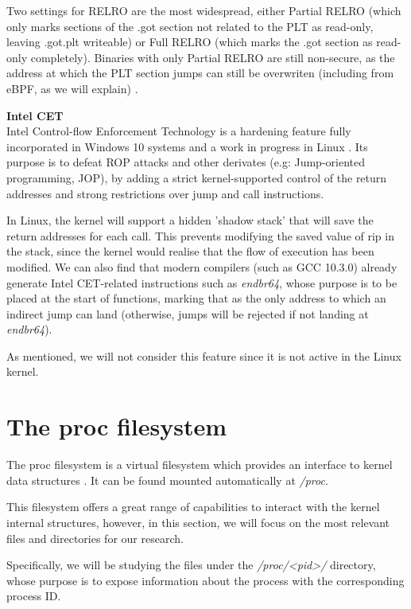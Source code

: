 Two settings for RELRO are the most widespread, either Partial RELRO (which only marks sections of the .got section not related to the PLT as read-only, leaving .got.plt writeable) or Full RELRO (which marks the .got section as read-only completely). Binaries with only Partial RELRO are still non-secure, as the address at which the PLT section jumps can still be overwriten (including from eBPF, as we will explain) \cite{relro_redhat}.

\textbf{Intel CET}\\
Intel Control-flow Enforcement Technology is a hardening feature fully incorporated in Windows 10 systems \cite{cet_windows} and a work in progress in Linux \cite{cet_linux}. Its purpose is to defeat ROP attacks and other derivates (e.g: Jump-oriented programming, JOP), by adding a strict kernel-supported control of the return addresses and strong restrictions over jump and call instructions.

In Linux, the kernel will support a hidden 'shadow stack' that will save the return addresses for each call. This prevents modifying the saved value of rip in the stack, since the kernel would realise that the flow of execution has been modified. We can also find that modern compilers (such as GCC 10.3.0) already generate Intel CET-related instructions such as \textit{endbr64}, whose purpose is to be placed at the start of functions, marking that as the only address to which an indirect jump can land (otherwise, jumps will be rejected if not landing at \textit{endbr64}).

As mentioned, we will not consider this feature since it is not active in the Linux kernel.

\section{The proc filesystem} \label{section:proc_filesystem}
The proc filesystem is a virtual filesystem which provides an interface to kernel data structures \cite{proc_fs}. It can be found mounted automatically at \textit{/proc}.

This filesystem offers a great range of capabilities to interact with the kernel internal structures, however, in this section, we will focus on the most relevant files and directories for our research.

Specifically, we will be studying the files under the \textit{/proc/<pid>/} directory, whose purpose is to expose information about the process with the corresponding process ID.

